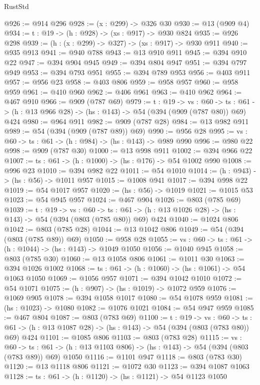 \begin{lexlean}{RustStd}
\begin{coremodule}
{\begin{coremodule}
{{{{{{{{@926 := @914 @296
@928 := (x : @299) -> @326 @30
@930 := @13 (@909 @4)
@934 := {t : @19} -> (h : @928) -> (xs : @917) -> @930 @824
@935 := @926 @298
@939 := (h : (x : @299) -> @327) -> (xs : @917) -> @930 @911
@940 := @935 @913
@941 := @940 @788
@943 := @13 @910 @911
@945 := @394 @910 @22
@947 := @394 @904 @945
@949 := @394 @804 @947
@951 := @394 @797 @949
@953 := @394 @793 @951
@955 := @394 @789 @953
@956 := @403 @911
@957 := @956 @23
@958 := @403 @806
@959 := @958 @957
@960 := @958 @959
@961 := @410 @960
@962 := @406 @961
@963 := @410 @962
@964 := @467 @910
@966 := @909 (@787 @69)
@979 := {t : @19} ->
  {vs : @60} ->
  {ts : @61} -> (h : @13 @966 @28) -> (hs : @143) -> @54 (@394 (@909 (@787 @80)) @69) @424
@980 := @964 @911
@982 := @909 (@787 @28)
@984 := @13 @982 @911
@989 := @54 (@394 (@909 (@787 @89)) @69)
@990 := @956 @28
@995 := {vs : @60} -> {ts : @61} -> (h : @984) -> (hs : @143) -> @989 @990
@996 := @980 @22
@998 := @909 (@787 @30)
@1000 := @13 @998 @911
@1002 := @394 @966 @22
@1007 := {ts : @61} -> (h : @1000) -> (hs : @176) -> @54 @1002 @990
@1008 := @996 @23
@1010 := @394 @982 @22
@1011 := @54 @1010
@1014 := (h : @943) -> (hs : @56) -> @1011 @957
@1015 := @1008 @941
@1017 := @394 @998 @22
@1019 := @54 @1017 @957
@1020 := (hs : @56) -> @1019
@1021 := @1015 @53
@1023 := @54 @945 @957
@1024 := @467 @904
@1026 := @803 (@785 @69)
@1039 := {t : @19} ->
  {vs : @60} ->
  {ts : @61} -> (h : @13 @1026 @28) -> (hs : @143) -> @54 (@394 (@803 (@785 @80)) @69) @424
@1040 := @1024 @806
@1042 := @803 (@785 @28)
@1044 := @13 @1042 @806
@1049 := @54 (@394 (@803 (@785 @89)) @69)
@1050 := @958 @28
@1055 := {vs : @60} -> {ts : @61} -> (h : @1044) -> (hs : @143) -> @1049 @1050
@1056 := @1040 @945
@1058 := @803 (@785 @30)
@1060 := @13 @1058 @806
@1061 := @1011 @30
@1063 := @394 @1026 @1002
@1068 := {ts : @61} -> (h : @1060) -> (hs : @1061) -> @54 @1063 @1050
@1069 := @1056 @957
@1071 := @394 @1042 @1010
@1072 := @54 @1071
@1075 := (h : @907) -> (hs : @1019) -> @1072 @959
@1076 := @1069 @905
@1078 := @394 @1058 @1017
@1080 := @54 @1078 @959
@1081 := (hs : @1023) -> @1080
@1082 := @1076 @1021
@1084 := @54 @947 @959
@1085 := @467 @804
@1087 := @803 (@783 @69)
@1100 := {t : @19} ->
  {vs : @60} ->
  {ts : @61} -> (h : @13 @1087 @28) -> (hs : @143) -> @54 (@394 (@803 (@783 @80)) @69) @424
@1101 := @1085 @806
@1103 := @803 (@783 @28)
@1115 := {vs : @60} ->
  {ts : @61} -> (h : @13 @1103 @806) -> (hs : @143) -> @54 (@394 (@803 (@783 @89)) @69) @1050
@1116 := @1101 @947
@1118 := @803 (@783 @30)
@1120 := @13 @1118 @806
@1121 := @1072 @30
@1123 := @394 @1087 @1063
@1128 := {ts : @61} -> (h : @1120) -> (hs : @1121) -> @54 @1123 @1050
}}}}}}}}
\end{coremodule}}
\end{coremodule}
\end{lexlean}
